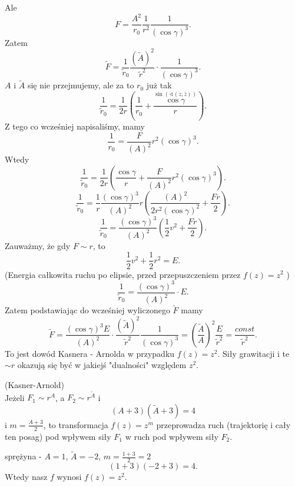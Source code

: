 \documentclass[../main.tex]{subfiles}
\begin{document}
Ale
\[
    F = \frac{A^2}{r_0}\frac{1}{r^2}\frac{1}{\left( \cos\gamma \right) ^3}
.\]
Zatem
\[
    \tilde F = \frac{1}{\tilde r_0}\frac{(\tilde A)^2}{\tilde r^2}\cdot \frac{1}{\left( \cos\gamma \right) ^3}
.\]
$A$ i $\tilde A$ się nie przejmujemy, ale za to $r_0$ już tak
\[
    \frac{1}{\tilde r_0} = \frac{1}{2 r}\left( \frac{1}{r_0} + \frac{\overset{\sin(\sphericalangle(\dot{z}, \bar{z}))}{\cos\gamma}}{r} \right)
.\]
Z tego co wcześniej napisaliśmy, mamy
\[
    \frac{1}{r_0} = \frac{F}{(A)^2}r^2(\cos\gamma)^3
.\]
Wtedy
\[
    \frac{1}{\tilde r_0} = \frac{1}{2r}\left( \frac{\cos\gamma}{r} + \frac{F}{(A)^2}r^2(\cos\gamma)^3 \right)
.\]
\[
    \frac{1}{\tilde r_0} = \frac{1}{r}\frac{(\cos\gamma)^3}{(A)^2}r\left( \frac{(A)^2}{2r^2(\cos\gamma)^2} + \frac{Fr}{2} \right)
.\]
\[
    \frac{1}{\tilde r_0} = \frac{(\cos\gamma)^3}{(A)^2}\left( \frac{1}{2}v^2 + \frac{Fr}{2} \right)
.\]
Zauważmy, że gdy $F \sim r$, to
 \[
     \frac{1}{2}v^2 + \frac{1}{2}r^2 = E
.\]
(Energia całkowita ruchu po elipsie, przed przepuszczeniem przez $f(z) = z^2$ )
\[
    \frac{1}{\tilde r_0} = \frac{(\cos\gamma)^3}{\left( A \right) ^2} \cdot E
.\]
Zatem podstawiając do wcześniej wyliczonego $\tilde F$ mamy
\[
    \tilde F = \frac{(\cos\gamma)^3 E}{(A)^2}\cdot \frac{(\tilde A)^2}{\tilde r^2}\frac{1}{(\cos\gamma)^3} = \left( \frac{\tilde A}{A} \right) ^2 \frac{E}{\tilde r^2} = \frac{const}{\tilde r^2}
.\]
To jest dowód Kasnera - Arnolda w przypadku $f(z) = z^2$. Siły grawitacji i te $\sim r$ okazują się być w jakiejś "dualności" względem $z^2$.
\pagebreak
\begin{tw}
    (Kasner-Arnold)\\
    Jeżeli $F_1\sim r^A$, a $F_2\sim r^{\tilde A}$ i
    \[
        \left( A+3 \right)(\tilde A + 3) = 4
    \]
    i $m = \frac{A+3}{2}$, to transformacja $f(z) = z^m$ przeprowadza ruch (trajektorię i cały ten posag) pod wpływem siły $F_1$ w ruch pod wpływem siły $F_2$.
\end{tw}
\begin{przyklad}
    sprężyna - $A = 1$, $\tilde A = -2$, $m = \frac{1+3}{2} = 2$
    \[
        (1+3)(-2+3) = 4
    .\]
Wtedy nasz $f$ wynosi $f(z) = z^2$.
\end{przyklad}
\end{document}
